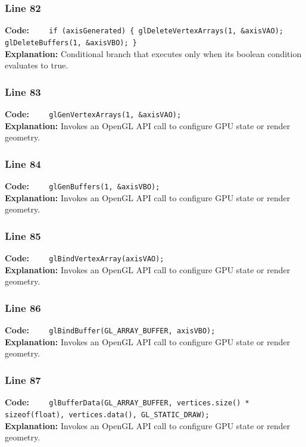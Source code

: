 \documentclass[11pt,a4paper]{article}
\begin{document}
\subsubsection*{Line 82}
\textbf{Code:} \verb|    if (axisGenerated) { glDeleteVertexArrays(1, &axisVAO); glDeleteBuffers(1, &axisVBO); }|\\
\textbf{Explanation:} Conditional branch that executes only when its boolean condition evaluates to true.

\subsubsection*{Line 83}
\textbf{Code:} \verb|    glGenVertexArrays(1, &axisVAO);|\\
\textbf{Explanation:} Invokes an OpenGL API call to configure GPU state or render geometry.

\subsubsection*{Line 84}
\textbf{Code:} \verb|    glGenBuffers(1, &axisVBO);|\\
\textbf{Explanation:} Invokes an OpenGL API call to configure GPU state or render geometry.

\subsubsection*{Line 85}
\textbf{Code:} \verb|    glBindVertexArray(axisVAO);|\\
\textbf{Explanation:} Invokes an OpenGL API call to configure GPU state or render geometry.

\subsubsection*{Line 86}
\textbf{Code:} \verb|    glBindBuffer(GL_ARRAY_BUFFER, axisVBO);|\\
\textbf{Explanation:} Invokes an OpenGL API call to configure GPU state or render geometry.

\subsubsection*{Line 87}
\textbf{Code:} \verb|    glBufferData(GL_ARRAY_BUFFER, vertices.size() * sizeof(float), vertices.data(), GL_STATIC_DRAW);|\\
\textbf{Explanation:} Invokes an OpenGL API call to configure GPU state or render geometry.
\end{document}
